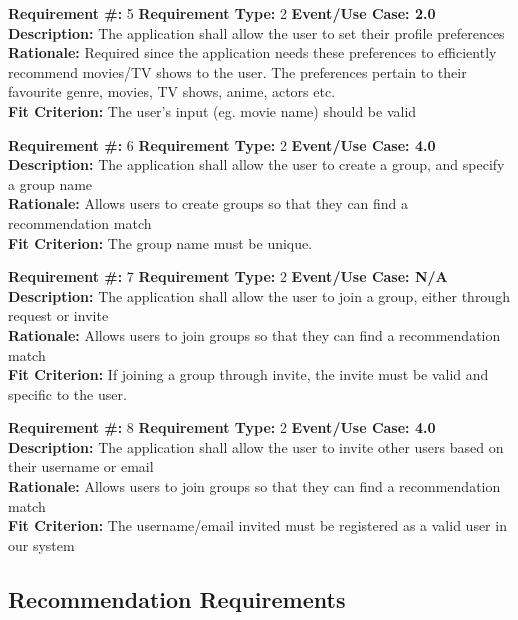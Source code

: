 \documentclass[12pt]{article}
\begin{document}
\bigskip
\textbf{Requirement \#:} 5 \quad \textbf{Requirement Type:} 2 \quad \textbf{Event/Use Case: 2.0}
\medskip
\\\textbf{Description:} The application shall allow the user to set their profile preferences 
\\\textbf{Rationale:} Required since the application needs these preferences to efficiently recommend movies/TV shows to the user. The preferences pertain to their favourite genre, movies, TV shows, anime, actors etc.
\\\textbf{Fit Criterion:} The user's input (eg. movie name) should be valid

\bigskip
\textbf{Requirement \#:} 6 \quad \textbf{Requirement Type:} 2 \quad \textbf{Event/Use Case: 4.0}
\medskip
\\\textbf{Description:} The application shall allow the user to create a group, and specify a group name
\\\textbf{Rationale:} Allows users to create groups so that they can find a recommendation match
\\\textbf{Fit Criterion:} The group name must be unique.

\bigskip
\textbf{Requirement \#:} 7 \quad \textbf{Requirement Type:} 2 \quad \textbf{Event/Use Case: N/A}
\medskip
\\\textbf{Description:} The application shall allow the user to join a group, either through request or invite
\\\textbf{Rationale:} Allows users to join groups so that they can find a recommendation match
\\\textbf{Fit Criterion:} If joining a group through invite, the invite must be valid and specific to the user.

\bigskip
\textbf{Requirement \#:} 8 \quad \textbf{Requirement Type:} 2 \quad \textbf{Event/Use Case: 4.0}
\medskip
\\\textbf{Description:} The application shall allow the user to invite other users based on their username or email
\\\textbf{Rationale:} Allows users to join groups so that they can find a recommendation match
\\\textbf{Fit Criterion:} The username/email invited must be registered as a valid user in our system 

\subsection{Recommendation Requirements} 
\noindent
\end{document}
